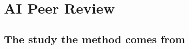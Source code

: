 %
%
%
%
\section{AI Peer Review}
\label{sec:peerreview}

\subsection{The study the method comes from}

